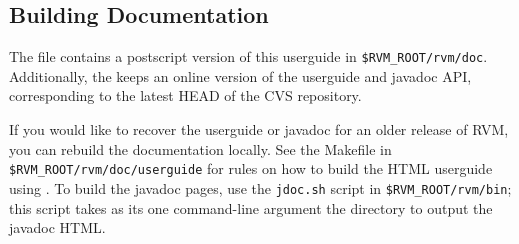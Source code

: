 \JavaTMFooter

\subsection{Building Documentation}

The {\tt \RVMTarFile} file contains a postscript version of this userguide
in {\tt \$RVM\_ROOT/rvm/doc}.  Additionally, the 
 keeps an online version of
the userguide and javadoc API, corresponding to the latest HEAD of the CVS
repository.

If you would like to recover the userguide or javadoc for an older release
of RVM, you can rebuild the documentation locally.  See the Makefile in
{\tt \$RVM\_ROOT/rvm/doc/userguide} for rules on how to build the
HTML userguide using
.  To build the javadoc pages, use
the {\tt jdoc.sh} script in {\tt \$RVM\_ROOT/rvm/bin}; this script takes as
its one command-line argument the directory to output the javadoc HTML.

